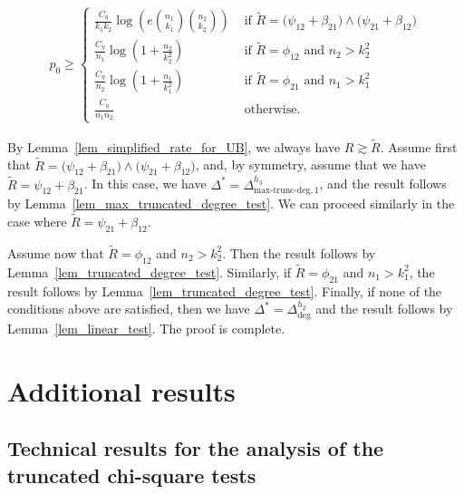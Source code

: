 \documentclass{article}
\newcommand{\lin}{\text{deg}}
\newcommand{\chisqmax}{\text{max-trunc-deg}}
\begin{document}
\begin{align*}
        p_0 \geq \begin{cases}
            \frac{C_\eta}{k_1k_2} \log\left(e{n_1 \choose k_1}{n_2 \choose k_2}\right) & \text{ if } \tilde R = \big(\psi_{12} + \beta_{21}\big) \land \big(\psi_{21} + \beta_{12}\big)\\[5pt]
            \frac{C_\eta}{n_1} \log\left(1+ \frac{n_2}{k_2^2}\right) & \text{ if } \tilde R = \phi_{12} \text{ and } n_2>k_2^2\\[5pt]
            \frac{C_\eta}{n_2} \log\left(1+ \frac{n_1}{k_1^2}\right) & \text{ if } \tilde R = \phi_{21} \text{ and } n_1>k_1^2\\[5pt]
            \frac{C_\eta}{n_1n_2} & \text{ otherwise.}
        \end{cases} 
    \end{align*}

By Lemma~\ref{lem_simplified_rate_for_UB}, we always have $R \gtrsim \tilde R$. 
Assume first that  $\tilde R = \big(\psi_{12} + \beta_{21}\big) \land \big(\psi_{21} + \beta_{12}\big)$, and, by symmetry, assume that we have  $\tilde R = \psi_{12} + \beta_{21}$. 
In this case, we have $\Delta^* = \Delta^{h_3}_{\chisqmax, 1}$, and the result follows by Lemma~\ref{lem_max_truncated_degree_test}. We can proceed similarly in the case where $\tilde R = \psi_{21} + \beta_{12}$. 

Assume now that $\tilde R = \phi_{12}$ and $n_2 > k_2^2$. Then the result follows by Lemma~\ref{lem_truncated_degree_test}. Similarly, if  
$\tilde R = \phi_{21}$ and $n_1 > k_1^2$, the result follows by Lemma~\ref{lem_truncated_degree_test}.
Finally, if none of the conditions above are satisfied, then we have $\Delta^* = \Delta^{h_2}_{\lin}$ and the result follows by Lemma~\ref{lem_linear_test}. 
The proof is complete.

\section{Additional results}

\subsection{Technical results for the analysis of the truncated chi-square tests}
\end{document}
